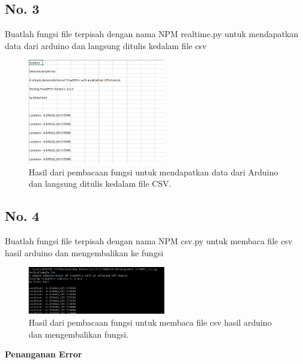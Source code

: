 	\subsection{No. 3}
	Buatlah fungsi file terpisah dengan nama NPM realtime.py untuk mendapatkan data dari arduino dan langsung ditulis kedalam file csv
	
	\hfill \break
	

	\begin{figure}[H]
		\includegraphics[width=6cm]{figures/chapter5/1174057/praktek/3.png}
		\centering
		\caption{Hasil dari pembacaan fungsi untuk mendapatkan data dari Arduino dan langsung ditulis kedalam file CSV.}
	\end{figure}

	\subsection{No. 4}	
	Buatlah fungsi file terpisah dengan nama NPM csv.py untuk membaca file csv hasil arduino dan mengembalikan ke fungsi
	
	\hfill \break
	
	
	\begin{figure}[H]
		\includegraphics[width=6cm]{figures/chapter5/1174057/praktek/4.png}
		\centering
		\caption{Hasil dari pembacaan fungsi untuk membaca file csv hasil arduino dan mengembalikan fungsi.}
	\end{figure}	
	
{\Large \textbf{Penanganan Error}}	
